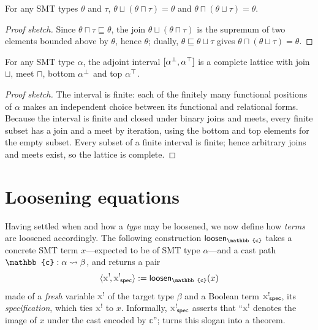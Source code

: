 \begin{lemma}[Absorption]
  For any SMT types $\theta$ and $\tau$, $\theta \sqcup (\theta \sqcap \tau) = \theta$ and $\theta \sqcap (\theta \sqcup \tau) = \theta$.
\end{lemma}
\begin{proof}[Proof sketch]
Since $\theta \sqcap \tau \sqsubseteq \theta$, the join $\theta \sqcup (\theta \sqcap \tau)$ is the supremum of two elements bounded above by $\theta$, hence $\theta$; dually, $\theta \sqsubseteq \theta \sqcup \tau$ gives $\theta \sqcap (\theta \sqcup \tau) = \theta$.
\end{proof}

\begin{theorem}
  \label{thm:loosening-lattice}
  For any SMT type $\alpha$, the adjoint interval $[{\alpha}^{\bot}, {\alpha}^{\top}]$ is a complete lattice with join $\sqcup$, meet $\sqcap$, bottom ${\alpha}^{\bot}$ and top ${\alpha}^{\top}$.
\end{theorem}
\begin{proof}[Proof sketch]
The interval is finite: each of the finitely many functional positions of $\alpha$ makes an independent choice between its functional and relational forms. Because the interval is finite and closed under binary joins and meets, every finite subset has a join and a meet by iteration, using the bottom and top elements for the empty subset. Every subset of a finite interval is finite; hence arbitrary joins and meets exist, so the lattice is complete.
\end{proof}

\section{Loosening equations}
\label{sec:loosening-rules}

Having settled when and how a \emph{type} may be loosened, we now define how \emph{terms} are loosened accordingly. The following construction $\regnotation{\mathsf{loosen}_{\mathbb{c}}}$ takes a concrete SMT term $x$---expected to be of SMT type $\alpha$---and a cast path $\mathbb{c} : \castpath{\alpha}{\beta}$, and returns a pair
\[
  \langle \regnotation{\lvar{x}}, \regnotation{\spec{\lvar{x}}} \rangle := \mathsf{loosen}_{\mathbb{c}}(x)
\]
made of a \emph{fresh} variable $\lvar{x}$ of the target type $\beta$ and a Boolean term $\spec{\lvar{x}}$, its \emph{specification}, which ties $\lvar{x}$ to $x$. Informally, $\spec{\lvar{x}}$ asserts that ``$\lvar{x}$ denotes the image of $x$ under the cast encoded by $\mathbb{c}$'';  turns this slogan into a theorem.

